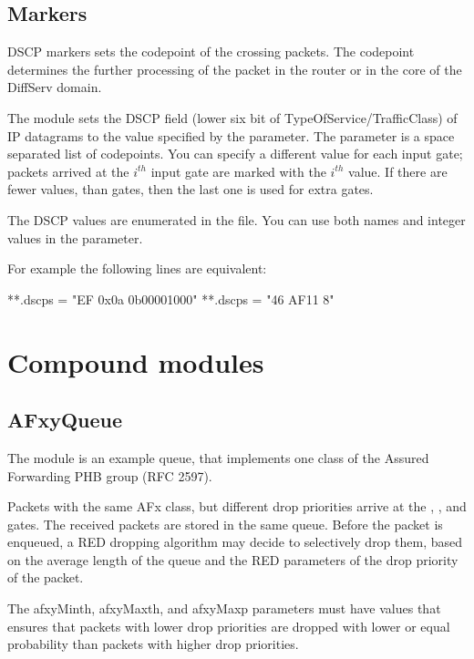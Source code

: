 \subsection{Markers}

DSCP markers sets the codepoint of the crossing packets.
The codepoint determines the further processing of the packet
in the router or in the core of the DiffServ domain.

The  module sets the DSCP field
(lower six bit of TypeOfService/TrafficClass) of IP datagrams
to the value specified by the  parameter.
The  parameter is a space separated list
of codepoints. You can specify a different value
for each input gate; packets arrived at the $i^{th}$
input gate are marked with the $i^{th}$ value.
If there are fewer values, than gates, then the last
one is used for extra gates.

The DSCP values are enumerated in the  file.
You can use both names and integer values in the 
parameter.

For example the following lines are equivalent:
\begin{inifile}
**.dscps = "EF 0x0a 0b00001000"
**.dscps = "46 AF11 8"
\end{inifile}

\section{Compound modules}

\subsection{AFxyQueue}

The  module is an example queue, that implements
one class of the Assured Forwarding PHB group (RFC 2597).

Packets with the same AFx class, but different drop priorities
arrive at the , , and  gates.
The received packets are stored in the same queue. Before the packet
is enqueued, a RED dropping algorithm may decide to selectively
drop them, based on the average length of the queue and the RED parameters
of the drop priority of the packet.

The afxyMinth, afxyMaxth, and afxyMaxp parameters must have values that
ensures that packets with lower drop priorities are dropped with lower
or equal probability than packets with higher drop priorities.

